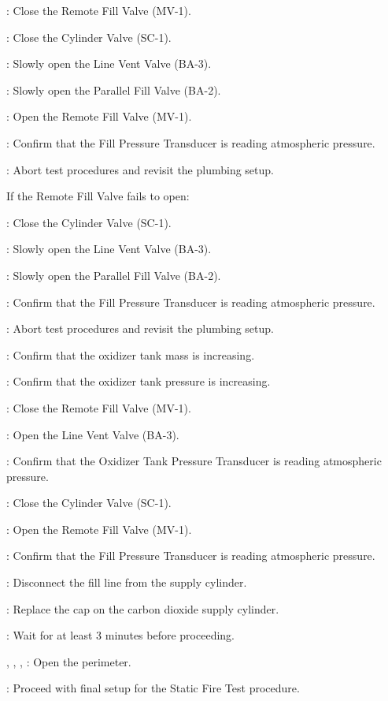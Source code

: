 \begin{checklist}
\begin{checklist}[label=$\bullet$]
    		\begin{checklist}
    			\item \control{}: Close the Remote Fill Valve (MV-1). 
    			\item \primary{}: Close the Cylinder Valve (SC-1).
    			\item \primary{}: Slowly open the Line Vent Valve (BA-3). 
    			\item \primary{}: Slowly open the Parallel Fill Valve (BA-2).
    			\item \control{}: Open the Remote Fill Valve (MV-1). 
    			\item \daq{}: Confirm that the Fill Pressure Transducer is reading atmospheric pressure. 
    			\item \ops{}: Abort test procedures and revisit the plumbing setup. 
    		\end{checklist}
    		\item If the Remote Fill Valve fails to open:
    		\begin{checklist}
    			\item \primary{}: Close the Cylinder Valve (SC-1). 
    			\item \primary{}: Slowly open the Line Vent Valve (BA-3). 
    			\item \primary{}: Slowly open the Parallel Fill Valve (BA-2).
    			\item \daq{}: Confirm that the Fill Pressure Transducer is reading atmospheric pressure. 
    			\item \ops{}: Abort test procedures and revisit the plumbing setup.
    		\end{checklist}
    	\end{checklist}
    	\item \daq{}: Confirm that the oxidizer tank mass is increasing. 
    	\item \daq{}: Confirm that the oxidizer tank pressure is increasing. 
    	\item \control{}: Close the Remote Fill Valve (MV-1).
    	\item \primary{}: Open the Line Vent Valve (BA-3). 
    	\item \daq{}: Confirm that the Oxidizer Tank Pressure Transducer is reading atmospheric pressure. 
    	\item \primary{}: Close the Cylinder Valve (SC-1). 
    	\item \control{}: Open the Remote Fill Valve (MV-1). 
    	\item \daq{}: Confirm that the Fill Pressure Transducer is reading atmospheric pressure. 
    	\item \primary{}: Disconnect the fill line from the supply cylinder. 
    	\item \primary{}: Replace the cap on the carbon dioxide supply cylinder. 
    	\item \ops{}: Wait for at least 3 minutes before proceeding. 
    	\item \peri{}, \perii{}, \periii{}, \periv{}: Open the perimeter. 
    	\item \ops{}: Proceed with final setup for the Static Fire Test procedure. 
\end{checklist}
